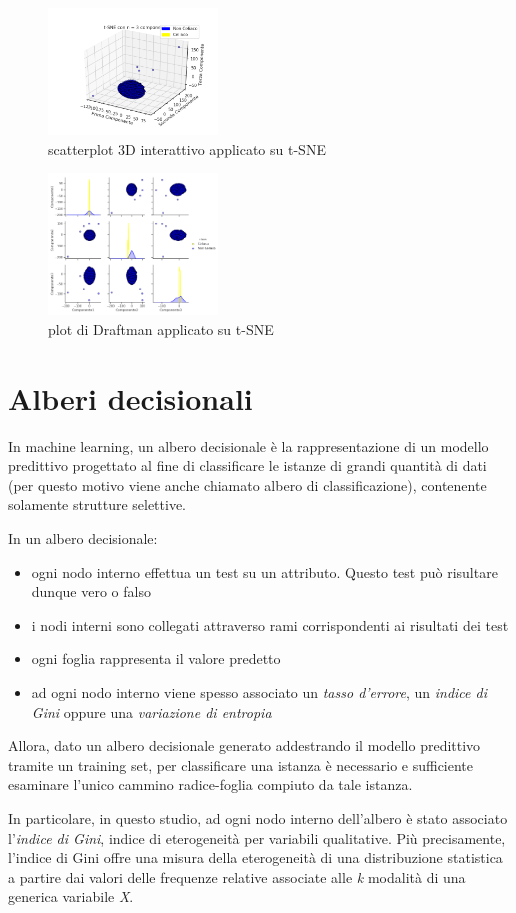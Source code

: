 \documentclass[11pt,a4paper,twocolumn]{article}
\begin{document}
	\begin{figure}[H]
		\centering
		\includegraphics[width=0.4\textwidth]{img/tSNE_i3D.png}
		\caption{scatterplot 3D interattivo applicato su t-SNE}
	\end{figure}

	\begin{figure}[H]
		\centering
		\includegraphics[width=0.4\textwidth]{img/tSNE_SPLOM.png}
		\caption{plot di Draftman applicato su t-SNE}
	\end{figure}

\section{Alberi decisionali}
In machine learning, un albero decisionale è la rappresentazione di un modello predittivo progettato al fine di classificare le istanze di grandi quantità di dati (per questo motivo viene anche chiamato albero di classificazione), contenente solamente strutture selettive.\par
In un albero decisionale:
\begin{itemize}
	\item ogni nodo interno effettua un test su un attributo. Questo test può risultare dunque vero o falso
	\item i nodi interni sono collegati attraverso rami corrispondenti ai risultati dei test
	\item ogni foglia rappresenta il valore predetto
	\item ad ogni nodo interno viene spesso associato un \emph{tasso d'errore}, un \emph{indice di Gini} oppure una \emph{variazione di entropia}
\end{itemize}
Allora, dato un albero decisionale generato addestrando il modello predittivo tramite un training set, per classificare una istanza è necessario e sufficiente esaminare l'unico cammino radice-foglia compiuto da tale istanza.\par
In particolare, in questo studio, ad ogni nodo interno dell'albero è stato associato l'\emph{indice di Gini}, indice di eterogeneità per variabili qualitative. Più precisamente, l'indice di Gini offre una misura della eterogeneità di una distribuzione statistica a partire dai valori delle frequenze relative associate alle \emph{k} modalità di una generica variabile \emph{X}.
\end{document}
